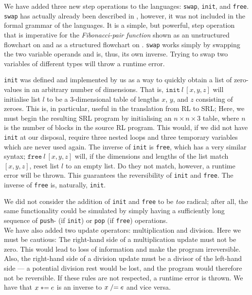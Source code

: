 \noindent We have added three new step operations to the languages: \texttt{swap}, \texttt{init}, and \texttt{free}. \texttt{swap} has actually already been described in \cite[p.~99]{REV}, however, it was not included in the formal grammar of the languages. It is a simple, but powerful, step operation that is imperative for the \textit{Fibonacci-pair function} shown as an unstructured flowchart on \cite[p.~99]{REV} and as a structured flowchart on \cite[p.~93]{REV}. \texttt{swap} works simply by swapping the two variable operands and is, thus, its own inverse. Trying to swap two variables of different types will throw a runtime error.

\texttt{init} was defined and implemented by us as a way to quickly obtain a list of zero-values in an arbitrary number of dimensions. That is, $\texttt{init} \ l \ [x,y,z]$ will initialise list $l$ to be a 3-dimensional table of lengths $x$, $y$, and $z$ consisting of zeroes. This is, in particular, useful in the translation from RL to SRL; Here, we must begin the resulting SRL program by initialising an $n \times n \times 3$ table, where $n$ is the number of blocks in the source RL program. This would, if we did not have \texttt{init} at our disposal, require three nested loops and three temporary variables which are never used again. The inverse of \texttt{init} is \texttt{free}, which has a very similar syntax; $\texttt{free} \ l \ [x,y,z]$ will, if the dimensions and lengths of the list match $[x,y,z]$, reset list $l$ to an empty list. Do they not match, however, a runtime error will be thrown. This guarantees the reversibility of \texttt{init} and \texttt{free}. The inverse of \texttt{free} is, naturally, \texttt{init}.

We did not consider the addition of \texttt{init} and \texttt{free} to be \textit{too} radical; after all, the same functionality could be simulated by simply having a sufficiently long sequence of \texttt{push}- (if \texttt{init}) or \texttt{pop} (if \texttt{free}) operations.\\

\noindent We have also added two update operators: multiplication and division. Here we must be cautious: The right-hand side of a multiplication update must not be zero. This would lead to loss of information and make the program irreversible. Also, the right-hand side of a division update must be a divisor of the left-hand side --- a potential division rest would be lost, and the program would therefore not be reversible. If these rules are not respected, a runtime error is thrown. We have that $x \mathrel{*}= e$ is an inverse to $x \mathrel{/}= e$ and vice versa. \\


